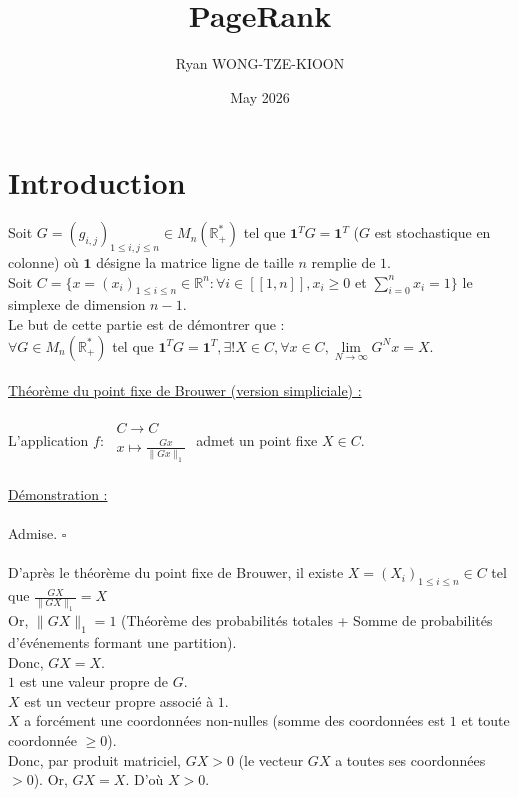 \documentclass{article}
\title{PageRank}
\author{Ryan WONG-TZE-KIOON}
\date{May 2026}
\begin{document}
\maketitle

\section{Introduction}

\newpage
Soit $G=(g_{i,j})_{1\leq i,j\leq n} \in M_n(\mathbb{R}_+^*)$ tel que $\textbf{1}^TG=\textbf{1}^T$ ($G$ est stochastique en colonne) où $\textbf{1}$ désigne la matrice ligne de taille $n$ remplie de $1$.
\\Soit $C = \{x=(x_i)_{1 \leq i \leq n} \in \mathbb{R}^n:\forall i \in[\![1,n]\!],x_i \geq 0$ et $\sum\limits_{i=0}^n x_i = 1\}$ le simplexe de dimension $n-1$.
\\Le but de cette partie est de démontrer que :
\\$\forall G\in M_n(\mathbb{R}_+^*)$ tel que $\textbf{1}^TG=\textbf{1}^T,\exists!X\in C,\forall x\in C,\lim\limits_{N\to\infty}G^Nx=X$.
\\\\\underline{Théorème du point fixe de Brouwer (version simpliciale) :}\\
\\L'application $f:$
$\begin{array}{c}
     C \longrightarrow C \\
     x \longmapsto \frac{Gx}{\|Gx\|_1}
\end{array}$
admet un point fixe $X \in C$.
\\\\\underline{Démonstration :}
\\\\Admise. $\square$
\\\\D'après le théorème du point fixe de Brouwer, il existe $X=(X_i)_{1\leq i\leq n} \in C$ tel que $\frac{GX}{\|GX\|_1}=X$
\\Or, $\|GX\|_1=1$ (Théorème des probabilités totales + Somme de probabilités d'événements formant une partition).
\\Donc, $GX=X$.
\\$1$ est une valeur propre de $G$.
\\$X$ est un vecteur propre associé à $1$.
\\$X$ a forcément une coordonnées non-nulles (somme des coordonnées est $1$ et toute coordonnée $\geq 0$).
\\Donc, par produit matriciel, $GX > 0$ (le vecteur $GX$ a toutes ses coordonnées $> 0$). Or, $GX=X$. D'où $X > 0$.
\end{document}
